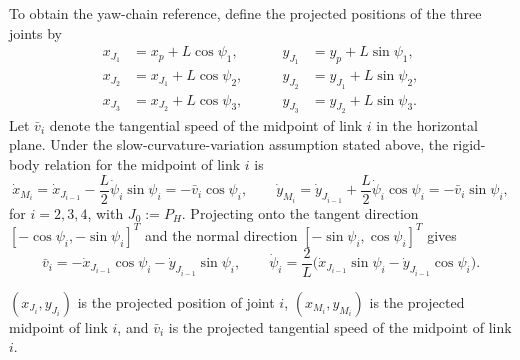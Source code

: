 \documentclass[12pt,a4paper]{report}
\newcommand{\newsymbols}[1]{\par\noindent{}#1\par\vspace{0.35em}}
\begin{document}
To obtain the yaw-chain reference, define the projected positions of the three joints by
\begin{equation}
\begin{aligned}
x_{J_1} &= x_p + L \cos \psi_1,
&\qquad
y_{J_1} &= y_p + L \sin \psi_1, \\
x_{J_2} &= x_{J_1} + L \cos \psi_2,
&\qquad
y_{J_2} &= y_{J_1} + L \sin \psi_2, \\
x_{J_3} &= x_{J_2} + L \cos \psi_3,
&\qquad
y_{J_3} &= y_{J_2} + L \sin \psi_3.
\end{aligned}
\end{equation}
Let $\bar{v}_i$ denote the tangential speed of the midpoint of link $i$ in the horizontal plane. Under the slow-curvature-variation assumption stated above, the rigid-body relation for the midpoint of link $i$ is
\begin{equation}
\dot{x}_{M_i} = \dot{x}_{J_{i-1}} - \frac{L}{2}\dot{\psi}_i \sin \psi_i = -\bar{v}_i \cos \psi_i,
\qquad
\dot{y}_{M_i} = \dot{y}_{J_{i-1}} + \frac{L}{2}\dot{\psi}_i \cos \psi_i = -\bar{v}_i \sin \psi_i,
\end{equation}
for $i = 2,3,4$, with $J_0 := P_H$. Projecting onto the tangent direction $[-\cos\psi_i,-\sin\psi_i]^T$ and the normal direction $[-\sin\psi_i,\cos\psi_i]^T$ gives
\begin{equation}
\bar{v}_i = -\dot{x}_{J_{i-1}}\cos\psi_i - \dot{y}_{J_{i-1}}\sin\psi_i,
\qquad
\dot{\psi}_i = \frac{2}{L}\bigl(\dot{x}_{J_{i-1}}\sin\psi_i - \dot{y}_{J_{i-1}}\cos\psi_i\bigr).
\end{equation}
\newsymbols{$(x_{J_i},y_{J_i})$ is the projected position of joint $i$, $(x_{M_i},y_{M_i})$ is the projected midpoint of link $i$, and $\bar{v}_i$ is the projected tangential speed of the midpoint of link $i$.}
\end{document}
